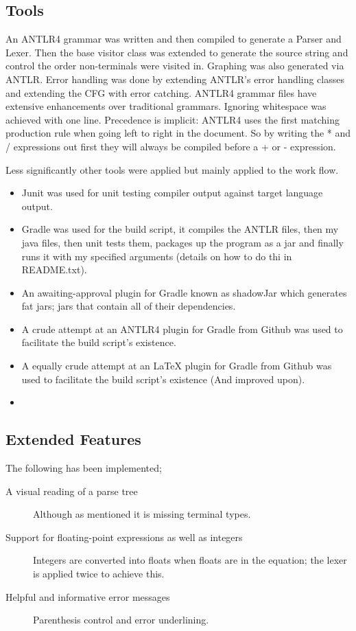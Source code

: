 \documentclass[a4paper,12pt]{article}
\begin{document}
\subsection{Tools}
An ANTLR4 grammar was written and then compiled to generate a Parser and Lexer. Then the base visitor class was extended to generate the source string and control the order non-terminals were visited in. Graphing was also generated via ANTLR. Error handling was done by extending ANTLR's error handling classes and extending the \gls{CFG} with error catching. ANTLR4 grammar files have extensive enhancements over traditional grammars. Ignoring whitespace was achieved with one
line. Precedence is implicit: ANTLR4 uses the first matching production rule when going left to right in the document. So by writing the * and / expressions out first they will always be compiled before a + or - expression.

Less significantly other tools were applied but mainly applied to the work flow. 
\begin{itemize}
    \item Junit was used for unit testing compiler output against target language output.
    \item Gradle was used for the build script, it compiles the ANTLR files, then my java files, then unit tests them, packages up the program as a jar and finally runs it with my specified arguments (details on how to do thi in README.txt).
    \item An awaiting-approval plugin for Gradle known as shadowJar which generates fat jars; jars that contain all of their dependencies.
    \item A crude attempt at an ANTLR4 plugin for Gradle from Github was used to facilitate the build script's existence.
    \item A equally crude attempt at an LaTeX plugin for Gradle from Github was used to facilitate the build script's existence (And improved upon).
    \item 
\end{itemize}

\subsection{Extended Features}
The following has been implemented;
\begin{description}
    \item[A visual reading of a parse tree] \hfill
        Although as mentioned it is missing terminal types.
    \item[Support for floating-point expressions as well as integers] \hfill
        Integers are converted into floats when floats are in the equation; the lexer is applied twice to achieve this.
    \item[Helpful and informative error messages]
        Parenthesis control and error underlining.
\end{description}
\end{document}
